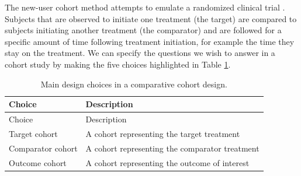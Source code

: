 \documentclass[]{book}
\begin{document}
The new-user cohort method attempts to emulate a randomized clinical
trial \citep{hernan_2016}. Subjects that are observed to initiate one
treatment (the target) are compared to subjects initiating another
treatment (the comparator) and are followed for a specific amount of
time following treatment initiation, for example the time they stay on
the treatment. We can specify the questions we wish to answer in a
cohort study by making the five choices highlighted in Table
\ref{tab:cmChoices}.

\begin{longtable}[]{@{}ll@{}}
\caption{\label{tab:cmChoices} Main design choices in a comparative cohort
design.}\tabularnewline
\toprule
\begin{minipage}[b]{0.23\columnwidth}\raggedright\strut
Choice\strut
\end{minipage} & \begin{minipage}[b]{0.71\columnwidth}\raggedright\strut
Description\strut
\end{minipage}\tabularnewline
\midrule
\endfirsthead
\toprule
\begin{minipage}[b]{0.23\columnwidth}\raggedright\strut
Choice\strut
\end{minipage} & \begin{minipage}[b]{0.71\columnwidth}\raggedright\strut
Description\strut
\end{minipage}\tabularnewline
\midrule
\endhead
\begin{minipage}[t]{0.23\columnwidth}\raggedright\strut
Target cohort\strut
\end{minipage} & \begin{minipage}[t]{0.71\columnwidth}\raggedright\strut
A cohort representing the target treatment\strut
\end{minipage}\tabularnewline
\begin{minipage}[t]{0.23\columnwidth}\raggedright\strut
Comparator cohort\strut
\end{minipage} & \begin{minipage}[t]{0.71\columnwidth}\raggedright\strut
A cohort representing the comparator treatment\strut
\end{minipage}\tabularnewline
\begin{minipage}[t]{0.23\columnwidth}\raggedright\strut
Outcome cohort\strut
\end{minipage} & \begin{minipage}[t]{0.71\columnwidth}\raggedright\strut
A cohort representing the outcome of interest\strut
\end{minipage}\tabularnewline

\end{longtable}
\end{document}
